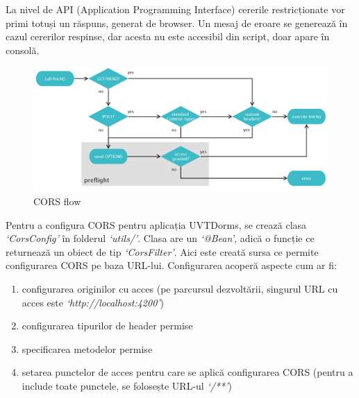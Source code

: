 \documentclass[12pt,a4paper]{report}
\theoremstyle{definition}
\theoremstyle{remark}
\begin{document}
\par La nivel de API (Application Programming Interface) cererile restricționate vor primi totuși un răspuns, generat de browser. Un mesaj de eroare se generează în cazul cererilor respinse, dar acesta nu este accesibil din script, doar apare în consolă.

\begin{figure}[H]
    \centering
    \includegraphics[width=1\linewidth]{resurse/diagrame/diagrama_cors.png}
    \caption{CORS flow\cite{gibbinscross}}
\end{figure}

\par Pentru a configura CORS pentru aplicația UVTDorms, se crează clasa \textit{`CorsConfig'} în folderul \textit{`utils/'}. Clasa are un \textit{`@Bean'}, adică o funcție ce returnează un obiect de tip \textit{`CorsFilter'}. Aici este creată sursa ce permite configurarea CORS pe baza URL-lui. Configurarea acoperă aspecte cum ar fi:

\begin{enumerate}
    \item configurarea originilor cu acces (pe parcursul dezvoltării, singurul URL cu acces este \textit{`http://localhost:4200'})
    \item configurarea tipurilor de header permise
    \item specificarea metodelor permise
    \item setarea punctelor de acces pentru care se aplică configurarea CORS (pentru a include toate punctele, se folosește URL-ul \textit{`/**'})
\end{enumerate}
\end{document}
